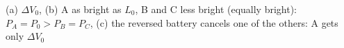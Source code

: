 (a) $\Delta V_0$, (b) A as bright as $L_0$, B and C less bright (equally bright): $P_A = P_0 > P_B = P_C$, (c) the reversed battery cancels one of the others: A gets only $\Delta V_0$
